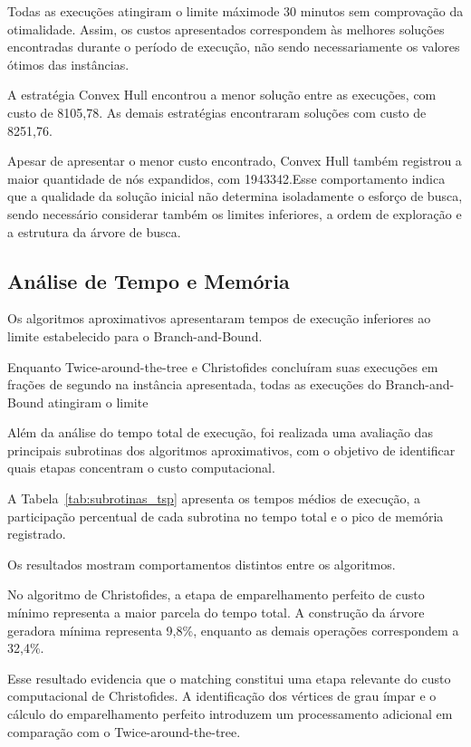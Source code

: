 \documentclass[12pt]{article}
\begin{document}
Todas as execuções atingiram o limite máximode 30 minutos sem comprovação da otimalidade.
Assim, os custos apresentados correspondem às melhores soluções encontradas durante
o período de execução, não sendo necessariamente os valores ótimos das instâncias.

A estratégia Convex Hull encontrou a menor solução entre as execuções, com custo de 8105,78.
As demais estratégias encontraram soluções com custo de 8251,76.

Apesar de apresentar o menor custo encontrado, Convex Hull também registrou a maior quantidade
de nós expandidos, com 1943342.Esse comportamento indica que a qualidade da solução inicial não determina isoladamente o esforço de busca, sendo necessário considerar também os limites inferiores, a ordem de exploração e a estrutura da árvore de busca.


\subsection{Análise de Tempo e Memória}

Os algoritmos aproximativos apresentaram tempos de execução  inferiores ao
limite estabelecido para o Branch-and-Bound.

Enquanto Twice-around-the-tree e Christofides concluíram suas execuções em frações de segundo
na instância apresentada, todas as execuções do Branch-and-Bound atingiram o limite 


Além da análise do tempo total de execução, foi realizada uma avaliação das principais subrotinas dos algoritmos aproximativos, com o objetivo de identificar quais etapas concentram o custo computacional.

A Tabela~\ref{tab:subrotinas_tsp} apresenta os tempos médios de execução, a participação percentual de cada subrotina no tempo total e o pico de memória registrado.

Os resultados mostram comportamentos distintos entre os algoritmos.

No algoritmo de Christofides, a etapa de emparelhamento perfeito de custo mínimo representa a maior parcela do tempo total. A construção da árvore geradora mínima representa 9,8\%, enquanto as demais operações correspondem a 32,4\%.

Esse resultado evidencia que o matching constitui uma etapa relevante do custo computacional de Christofides. A identificação dos vértices de grau ímpar e o cálculo do emparelhamento perfeito introduzem um processamento adicional em comparação com o Twice-around-the-tree.
\end{document}
